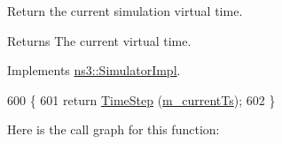 Return the current simulation virtual time.

\begin{DoxyReturn}{Returns}
The current virtual time. 
\end{DoxyReturn}


Implements \hyperlink{classns3_1_1SimulatorImpl_aa516c50060846adc6fd316e83ef0797c}{ns3\+::\+Simulator\+Impl}.


\begin{DoxyCode}
600 \{
601   \textcolor{keywordflow}{return} \hyperlink{group__time_ga464a3c1cbb458c6c3ed3bd5ce9506758}{TimeStep} (\hyperlink{classns3_1_1RealtimeSimulatorImpl_a613ff41dee1e66129c4d5cc81c00cf60}{m\_currentTs});
602 \}
\end{DoxyCode}


Here is the call graph for this function\+:


